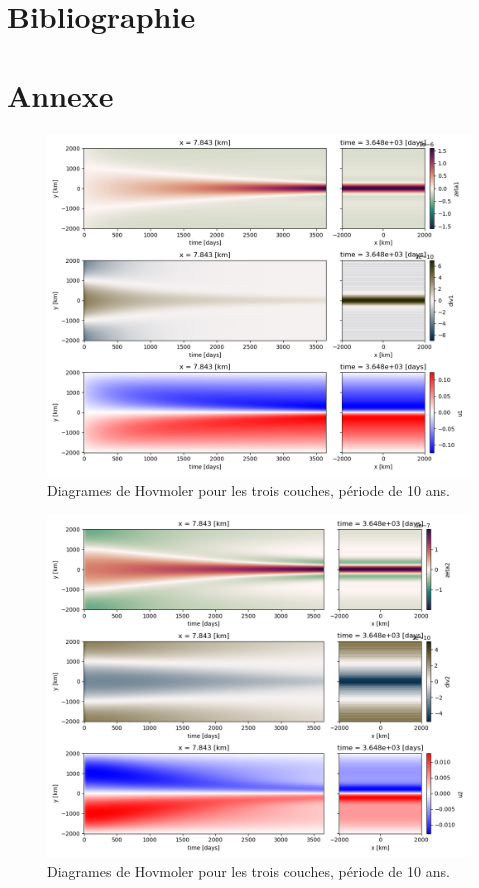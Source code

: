 \documentclass{article}
\numberwithin{equation}{section}
\begin{document}
\section{Bibliographie}
\label{sec:orgcc7bab5}



\section{Annexe}
\label{sec:org132d00a}

\begin{figure}[htbp]
\centering
\includegraphics[width=.9\linewidth]{figures/tests/test1_2023-03-31.png}
\caption{\label{fig:orgada75b3}Diagrames de Hovmoler pour les trois couches, période de 10 ans.}
\end{figure}
\begin{figure}[htbp]
\centering
\includegraphics[width=.9\linewidth]{figures/tests/test2_2023-03-31.png}
\caption{\label{fig:orgada75b3}Diagrames de Hovmoler pour les trois couches, période de 10 ans.}
\end{figure}
\end{document}
